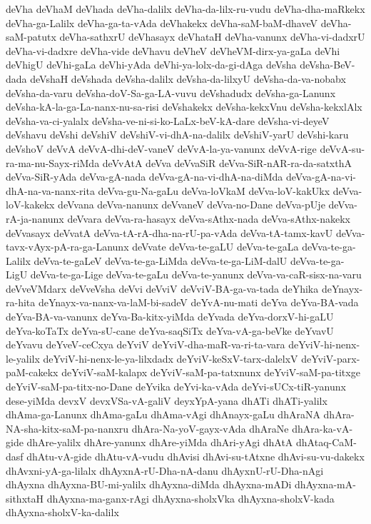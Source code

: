 {deVha
deVhaM
deVhada
deVha-dalilx
deVha-da-lilx-ru-vudu
deVha-dha-maRkekx
deVha-ga-Lalilx
deVha-ga-ta-vAda
deVhakekx
deVha-saM-baM-dhaveV
deVha-saM-patutx
deVha-sathxrU
deVhasayx
deVhataH
deVha-vanunx
deVha-vi-dadxrU
deVha-vi-dadxre
deVha-vide
deVhavu
deVheV
deVheVM-dirx-ya-gaLa
deVhi
deVhigU
deVhi-gaLa
deVhi-yAda
deVhi-ya-lolx-da-gi-dAga
deVsha
deVsha-BeV-dada
deVshaH
deVshada
deVsha-dalilx
deVsha-da-lilxyU
deVsha-da-va-nobabx
deVsha-da-varu
deVsha-doV-Sa-ga-LA-vuvu
deVshadudx
deVsha-ga-Lanunx
deVsha-kA-la-ga-La-nanx-nu-sa-risi
deVshakekx
deVsha-kekxVnu
deVsha-kekxlAlx
deVsha-va-ci-yalalx
deVsha-ve-ni-si-ko-LaLx-beV-kA-dare
deVsha-vi-deyeV
deVshavu
deVshi
deVshiV
deVshiV-vi-dhA-na-dalilx
deVshiV-yarU
deVshi-karu
deVshoV
deVvA
deVvA-dhi-deV-vaneV
deVvA-la-ya-vanunx
deVvA-rige
deVvA-su-ra-ma-nu-Sayx-riMda
deVvAtA
deVva
deVvaSiR
deVva-SiR-nAR-ra-da-satxthA
deVva-SiR-yAda
deVva-gA-nada
deVva-gA-na-vi-dhA-na-diMda
deVva-gA-na-vi-dhA-na-va-nanx-rita
deVva-gu-Na-gaLu
deVva-loVkaM
deVva-loV-kakUkx
deVva-loV-kakekx
deVvana
deVva-nanunx
deVvaneV
deVva-no-Dane
deVva-pUje
deVva-rA-ja-nanunx
deVvara
deVva-ra-hasayx
deVva-sAthx-nada
deVva-sAthx-nakekx
deVvasayx
deVvatA
deVva-tA-rA-dha-na-rU-pa-vAda
deVva-tA-tamx-kavU
deVva-tavx-vAyx-pA-ra-ga-Lanunx
deVvate
deVva-te-gaLU
deVva-te-gaLa
deVva-te-ga-Lalilx
deVva-te-gaLeV
deVva-te-ga-LiMda
deVva-te-ga-LiM-dalU
deVva-te-ga-LigU
deVva-te-ga-Lige
deVva-te-gaLu
deVva-te-yanunx
deVva-va-caR-sisx-na-varu
deVveVMdarx
deVveVsha
deVvi
deVviV
deVviV-BA-ga-va-tada
deYhika
deYnayx-ra-hita
deYnayx-va-nanx-va-laM-bi-sadeV
deYvA-nu-mati
deYva
deYva-BA-vada
deYva-BA-va-vanunx
deYva-Ba-kitx-yiMda
deYvada
deYva-dorxV-hi-gaLU
deYva-koTaTx
deYva-sU-cane
deYva-saqSiTx
deYva-vA-ga-beVke
deYvavU
deYvavu
deYveV-ceCxya
deYviV
deYviV-dha-maR-va-ri-ta-vara
deYviV-hi-nenx-le-yalilx
deYviV-hi-nenx-le-ya-lilxdadx
deYviV-keSxV-tarx-dalelxV
deYviV-parx-paM-cakekx
deYviV-saM-kalapx
deYviV-saM-pa-tatxnunx
deYviV-saM-pa-titxge
deYviV-saM-pa-titx-no-Dane
deYvika
deYvi-ka-vAda
deYvi-sUCx-tiR-yanunx
dese-yiMda
devxV
devxVSa-vA-galiV
deyxYpA-yana
dhATi
dhATi-yalilx
dhAma-ga-Lanunx
dhAma-gaLu
dhAma-vAgi
dhAnayx-gaLu
dhAraNA
dhAra-NA-sha-kitx-saM-pa-nanxru
dhAra-Na-yoV-gayx-vAda
dhAraNe
dhAra-ka-vA-gide
dhAre-yalilx
dhAre-yanunx
dhAre-yiMda
dhAri-yAgi
dhAtA
dhAtaq-CaM-dasf
dhAtu-vA-gide
dhAtu-vA-vudu
dhAvisi
dhAvi-su-tAtxne
dhAvi-su-vu-dakekx
dhAvxni-yA-ga-lilalx
dhAyxnA-rU-Dha-nA-danu
dhAyxnU-rU-Dha-nAgi
dhAyxna
dhAyxna-BU-mi-yalilx
dhAyxna-diMda
dhAyxna-mADi
dhAyxna-mA-sithxtaH
dhAyxna-ma-ganx-rAgi
dhAyxna-sholxVka
dhAyxna-sholxV-kada
dhAyxna-sholxV-ka-dalilx
}
